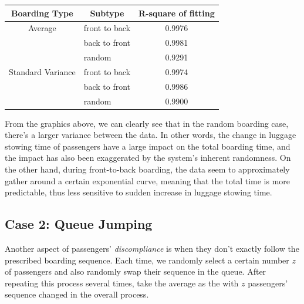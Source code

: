 \documentclass{article}
\theoremstyle{definition}
\theoremstyle{remark}
\numberwithin{equation}{section}
\begin{document}
	\begin{center}
		\begin{tabular}{l|l|c}
			\hline
			\multicolumn{1}{c|}{Boarding Type}     & \multicolumn{1}{c|}{Subtype} & \multicolumn{1}{c}{R-square of fitting} \\ \hline
			\multicolumn{1}{c|}{Average}           & front to back                & 0.9976                                                          \\ \cline{2-3}
												   & back to front                & 0.9981                                                          \\ \cline{2-3}
												   & random                       & 0.9291                                                          \\ \hline
			\multicolumn{1}{c|}{Standard Variance} & front to back                & 0.9974                                                          \\ \cline{2-3}
												   & back to front                & 0.9986                                                          \\ \cline{2-3}
												   & random                       & 0.9900                                                          \\ \hline
		\end{tabular}
	\end{center}

	From the graphics above, we can clearly see that in the random boarding case, there's a larger variance between the data. In other words, the change in luggage stowing time of passengers have a large impact on the total boarding time, and the impact has also been exaggerated by the system's inherent randomness. On the other hand, during front-to-back boarding, the data seem to approximately gather around a certain exponential curve, meaning that the total time is more predictable, thus less sensitive to sudden increase in luggage stowing time.

	\subsection{Case 2: Queue Jumping}
	Another aspect of passengers' \textit{discompliance} is when they don't exactly follow the prescribed boarding sequence. Each time, we randomly select a certain number \(z\) of passengers and also randomly swap their sequence in the queue. After repeating this process several times, take the average as the  with \(z\) passengers' sequence changed in the overall process.
\end{document}
